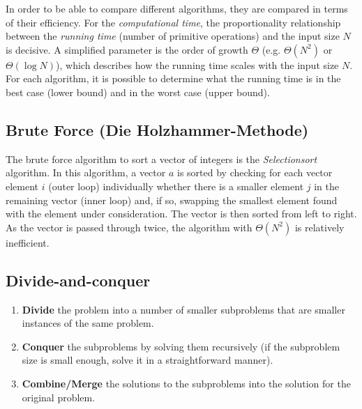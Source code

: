 

In order to be able to compare different algorithms, they are compared in terms of their efficiency. For the \emph{computational time}, the proportionality relationship between the \emph{running time} (number of primitive operations) and the input size $N$ is decisive. A simplified parameter is the order of growth $\Theta$ (e.g. $\Theta(N^2)$ or $\Theta(\log N)$), which describes how the running time scales with the input size $N$. For each algorithm, it is possible to determine what the running time is in the best case (lower bound) and in the worst case (upper bound).

\subsection{Brute Force (Die Holzhammer-Methode)}


The brute force algorithm to sort a vector of integers is the \emph{Selectionsort} algorithm. In this algorithm, a vector $a$ is sorted by checking for each vector element $i$ (outer loop) individually whether there is a smaller element $j$ in the remaining vector (inner loop) and, if so, swapping the smallest element found with the element under consideration. The vector is then sorted from left to right. As the vector is passed through twice, the algorithm with $\Theta(N^2)$ is relatively inefficient.

%

\subsection{Divide-and-conquer}

\begin{enumerate}
    \item \textbf{Divide} the problem into a number of smaller subproblems that are smaller instances of the same problem.
    \item \textbf{Conquer} the subproblems by solving them recursively (if the subproblem size is small enough, solve it in a straightforward manner).
    \item \textbf{Combine/Merge} the solutions to the subproblems into the solution for the original problem.
\end{enumerate}


